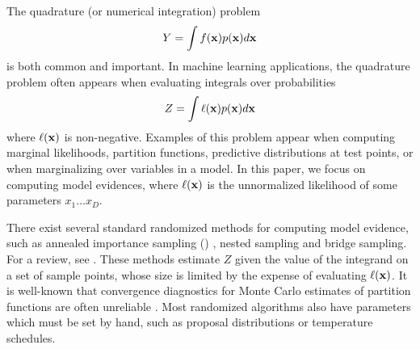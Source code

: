 \documentclass{article}
\begin{document}
The quadrature (or numerical integration) problem 
\begin{equation}\label{eq:Y}
Y = \int f(\vlfv) p(\vlfv) d\vlfv
\end{equation}
is both common and important.  In machine learning applications, the quadrature problem often appears when evaluating integrals over probabilities
\begin{equation}\label{eq:ev}
Z = \int \ell(\vlfv) p(\vlfv) d\vlfv
\end{equation}
where $\ell(\vlfv)$ is non-negative.  Examples of this problem appear when computing marginal likelihoods, partition functions, predictive distributions at test points, or when marginalizing over variables in a model.  In this paper, we focus on computing model evidences, where $\ell(\vlfv)$ is the unnormalized likelihood of some parameters $x_1 \dots x_D$.


There exist several standard randomized methods for computing model evidence, such as annealed importance sampling () \citep{neal2001annealed}, nested sampling \citep{skilling2004nested} and bridge sampling.  For a review, see \citet{chen2000monte}.   These methods estimate $Z$ given the value of the integrand on a set of sample points, whose size is limited by the expense of evaluating $\ell(\vlfv)$.  It is well-known that convergence diagnostics for Monte Carlo estimates of partition functions are often unreliable \citep{NealMC, brooks1998convergence, cowles1999possible}.  Most randomized algorithms also have parameters which must be set by hand, such as proposal distributions or temperature schedules.

\end{document}
